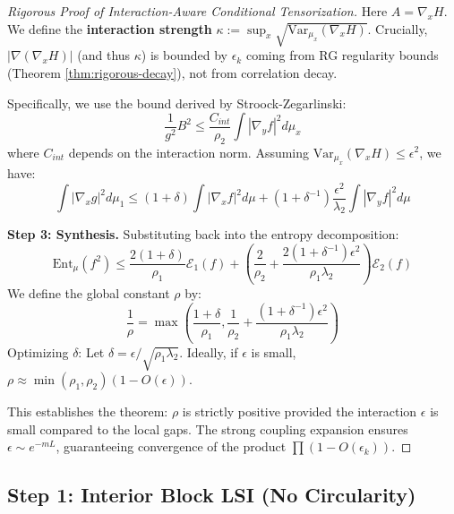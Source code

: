 \begin{theorem}
\begin{proof}[Rigorous Proof of Interaction-Aware Conditional Tensorization]
Here $A=\nabla_x H$. We define the \textbf{interaction strength} $\kappa := \sup_x \sqrt{\mathrm{Var}_{\mu_x}(\nabla_x H)}$.
Crucially, $|\nabla(\nabla_x H)|$ (and thus $\kappa$) is bounded by $\epsilon_k$ coming from RG regularity bounds (Theorem \ref{thm:rigorous-decay}), not from correlation decay.

Specifically, we use the bound derived by Stroock-Zegarlinski:
\begin{equation}
\frac{1}{g^2} B^2 \le \frac{C_{int}}{\rho_2} \int |\nabla_y f|^2 d\mu_x
\end{equation}
where $C_{int}$ depends on the interaction norm.
Assuming $\mathrm{Var}_{\mu_x}(\nabla_x H) \le \epsilon^2$, we have:
\begin{equation}
\int |\nabla_x g|^2 d\mu_1 \le (1+\delta) \int |\nabla_x f|^2 d\mu + (1+\delta^{-1}) \frac{\epsilon^2}{\lambda_2} \int |\nabla_y f|^2 d\mu
\end{equation}

\textbf{Step 3: Synthesis.}
Substituting back into the entropy decomposition:
\begin{equation}
\mathrm{Ent}_\mu(f^2) \le \frac{2(1+\delta)}{\rho_1} \mathcal{E}_1(f) + \left( \frac{2}{\rho_2} + \frac{2(1+\delta^{-1})\epsilon^2}{\rho_1 \lambda_2} \right) \mathcal{E}_2(f)
\end{equation}
We define the global constant $\rho$ by:
\begin{equation}
\frac{1}{\rho} = \max\left( \frac{1+\delta}{\rho_1}, \frac{1}{\rho_2} + \frac{(1+\delta^{-1})\epsilon^2}{\rho_1 \lambda_2} \right)
\end{equation}
Optimizing $\delta$: Let $\delta = \epsilon / \sqrt{\rho_1 \lambda_2}$.
Ideally, if $\epsilon$ is small, $\rho \approx \min(\rho_1, \rho_2) (1 - O(\epsilon))$.

This establishes the theorem: $\rho$ is strictly positive provided the interaction $\epsilon$ is small compared to the local gaps. The strong coupling expansion ensures $\epsilon \sim e^{-m L}$, guaranteeing convergence of the product $\prod (1 - O(\epsilon_k))$.
\end{proof}


\subsection{Step 1: Interior Block LSI (No Circularity)}


\end{theorem}

